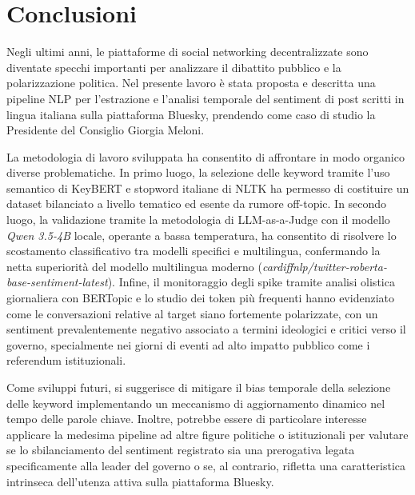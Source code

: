 \documentclass[11pt]{article}
\begin{document}
\newpage
\section{Conclusioni}
\label{sec:conclusioni}

Negli ultimi anni, le piattaforme di social networking decentralizzate sono diventate specchi importanti per analizzare il dibattito pubblico e la polarizzazione politica. Nel presente lavoro è stata proposta e descritta una pipeline NLP per l'estrazione e l'analisi temporale del sentiment di post scritti in lingua italiana sulla piattaforma Bluesky, prendendo come caso di studio la Presidente del Consiglio Giorgia Meloni. 

La metodologia di lavoro sviluppata ha consentito di affrontare in modo organico diverse problematiche. In primo luogo, la selezione delle keyword tramite l'uso semantico di KeyBERT e stopword italiane di NLTK ha permesso di costituire un dataset bilanciato a livello tematico ed esente da rumore off-topic. In secondo luogo, la validazione tramite la metodologia di LLM-as-a-Judge con il modello \textit{Qwen 3.5-4B} locale, operante a bassa temperatura, ha consentito di risolvere lo scostamento classificativo tra modelli specifici e multilingua, confermando la netta superiorità del modello multilingua moderno (\textit{cardiffnlp/twitter-roberta-base-sentiment-latest}). Infine, il monitoraggio degli spike tramite analisi olistica giornaliera con BERTopic e lo studio dei token più frequenti hanno evidenziato come le conversazioni relative al target siano fortemente polarizzate, con un sentiment prevalentemente negativo associato a termini ideologici e critici verso il governo, specialmente nei giorni di eventi ad alto impatto pubblico come i referendum istituzionali.

Come sviluppi futuri, si suggerisce di mitigare il bias temporale della selezione delle keyword implementando un meccanismo di aggiornamento dinamico nel tempo delle parole chiave. Inoltre, potrebbe essere di particolare interesse applicare la medesima pipeline ad altre figure politiche o istituzionali per valutare se lo sbilanciamento del sentiment registrato sia una prerogativa legata specificamente alla leader del governo o se, al contrario, rifletta una caratteristica intrinseca dell'utenza attiva sulla piattaforma Bluesky.
\end{document}
